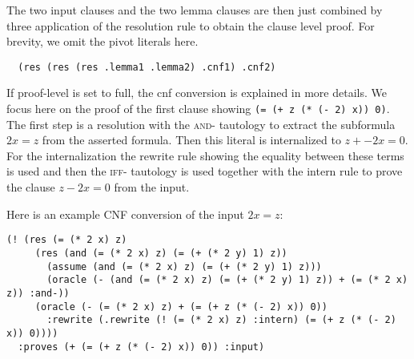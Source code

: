 \documentclass[a4paper]{article}
\newcommand\smtlib[1]{\texttt{#1}}
\begin{document}
The two input clauses and the two lemma clauses are then just combined by
three application of the resolution rule to obtain the clause level proof.
For brevity, we omit the pivot literals here.

\begin{verbatim}
  (res (res (res .lemma1 .lemma2) .cnf1) .cnf2)
\end{verbatim}

If proof-level is set to full, the cnf conversion is explained in more
details.  We focus here on the proof of the first clause showing
\smtlib{(= (+ z (* (- 2) x)) 0)}.  The first step is a resolution with
the \textsc{and-} tautology to extract the subformula $2x=z$ from the
asserted formula.  Then this literal is internalized to $z + -2x = 0$.
For the internalization the rewrite rule showing the equality between
these terms is used and then the \textsc{iff-} tautology is used
together with the intern rule to prove the clause $z-2x=0$ from the
input.

Here is an example CNF conversion of the input $2x=z$:
\begin{verbatim}
(! (res (= (* 2 x) z)
     (res (and (= (* 2 x) z) (= (+ (* 2 y) 1) z))
       (assume (and (= (* 2 x) z) (= (+ (* 2 y) 1) z)))
       (oracle (- (and (= (* 2 x) z) (= (+ (* 2 y) 1) z)) + (= (* 2 x) z)) :and-))
     (oracle (- (= (* 2 x) z) + (= (+ z (* (- 2) x)) 0))
       :rewrite (.rewrite (! (= (* 2 x) z) :intern) (= (+ z (* (- 2) x)) 0))))
  :proves (+ (= (+ z (* (- 2) x)) 0)) :input)
\end{verbatim}
\end{document}
